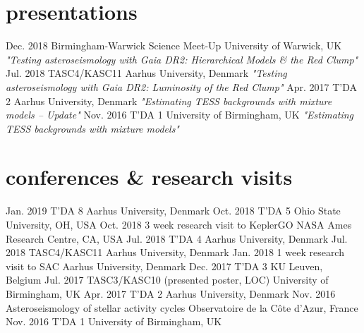 \documentclass[]{k-cv} %
\begin{document}

\section{presentations}

\begin{entrylist}
\entry
{Dec. 2018}
{Birmingham-Warwick Science Meet-Up}
{University of Warwick, UK}
{\emph{"Testing asteroseismology with \textit{Gaia} DR2: Hierarchical Models \& the Red Clump"}}
\entry
{Jul. 2018}
{TASC4/KASC11}
{Aarhus University, Denmark}
{\emph{"Testing asteroseismology with \textit{Gaia} DR2: Luminosity of the Red Clump"}}
\entry
{Apr. 2017}
{T'DA 2}
{Aarhus University, Denmark}
{\emph{"Estimating TESS backgrounds with mixture models -- Update"}}
\entry
{Nov. 2016}
{T'DA 1}
{University of Birmingham, UK}
{\emph{"Estimating TESS backgrounds with mixture models"}}
\end{entrylist}

\section{conferences \& research visits}

\begin{entrylist}
\entrythree
{Jan. 2019}
{T'DA 8}
{Aarhus University, Denmark}
\entrythree
{Oct. 2018}
{T'DA 5}
{Ohio State University, OH, USA}
\entrythree
{Oct. 2018}
{3 week research visit to KeplerGO}
{NASA Ames Research Centre, CA, USA}
\entrythree
{Jul. 2018}
{T'DA 4}
{Aarhus University, Denmark}
\entrythree
{Jul. 2018}
{TASC4/KASC11}
{Aarhus University, Denmark}
\entrythree
{Jan. 2018}
{1 week research visit to SAC}
{Aarhus University, Denmark}
\entrythree
{Dec. 2017}
{T'DA 3}
{KU Leuven, Belgium}
\entrythree
{Jul. 2017}
{TASC3/KASC10 (presented poster, LOC)}
{University of Birmingham, UK}
\entrythree
{Apr. 2017}
{T'DA 2}
{Aarhus University, Denmark}
\entrythree
{Nov. 2016}
{Asteroseismology of stellar activity cycles}
{Observatoire de la C\^{o}te d'Azur, France}
\entrythree
{Nov. 2016}
{T'DA 1}
{University of Birmingham, UK}
\end{entrylist}
\end{document}
